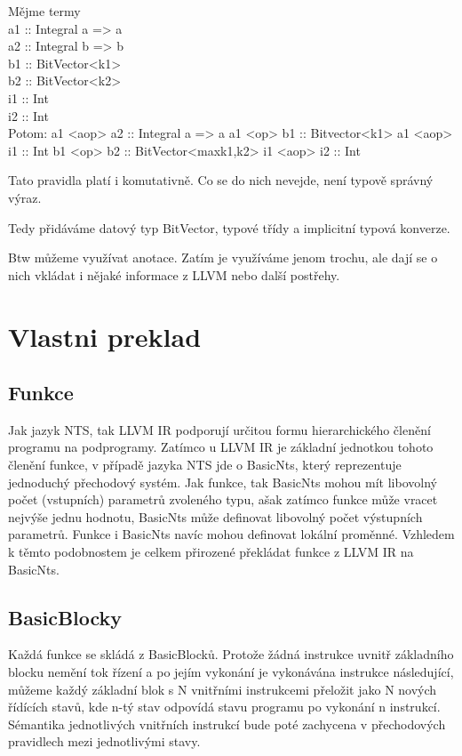 \documentclass{fithesis2}
\begin{document}

Mějme termy\\
a1 :: Integral a => a\\
a2 :: Integral b => b\\
b1 :: BitVector<k1> \\
b2 :: BitVector<k2>\\
i1 :: Int\\
i2 :: Int\\

Potom:
a1 <aop> a2 :: Integral a => a
a1 <op>  b1 :: Bitvector<k1>
a1 <aop> i1 :: Int
b1 <op>  b2 :: BitVector<max{k1,k2}>
i1 <aop> i2 :: Int

Tato pravidla platí i komutativně. Co se do nich nevejde, není typově správný výraz.

Tedy přidáváme datový typ BitVector, typové třídy a implicitní typová konverze.

Btw můžeme využívat anotace. Zatím je využíváme jenom trochu, ale dají se o nich vkládat
i nějaké informace z LLVM nebo další postřehy.

\section{Vlastni preklad}

\subsection{Funkce}
Jak jazyk NTS, tak LLVM IR podporují určitou formu hierarchického členění programu na podprogramy. Zatímco u LLVM IR je základní jednotkou tohoto členění funkce, v případě jazyka NTS jde o BasicNts, který reprezentuje jednoduchý přechodový systém. Jak funkce, tak BasicNts mohou mít libovolný počet (vstupních) parametrů zvoleného typu, ašak zatímco funkce může vracet nejvýše jednu hodnotu, BasicNts může definovat libovolný počet výstupních parametrů. Funkce i BasicNts navíc mohou definovat lokální proměnné. Vzhledem k těmto podobnostem je celkem přirozené překládat funkce z LLVM IR na BasicNts.

\subsection{BasicBlocky}
Každá funkce se skládá z BasicBlocků. Protože žádná instrukce uvnitř základního blocku nemění tok řízení a po jejím vykonání je vykonávána instrukce následující, můžeme každý základní blok s N vnitřními instrukcemi přeložit jako N nových řídících stavů, kde n-tý stav odpovídá stavu programu po vykonání n instrukcí. Sémantika jednotlivých vnitřních instrukcí bude poté zachycena v přechodových pravidlech mezi jednotlivými stavy.
\end{document}
